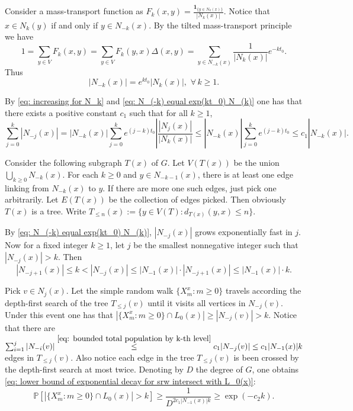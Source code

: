 \documentclass[12pt]{article}
\numberwithin{equation}{section}
\newcommand{\be}{\begin{equation}}
\newcommand{\ee}{\end{equation}}
\newcommand{\1}{\mathbf{1}}
\begin{document}






Consider a mass-transport function as $F_k(x,y)=\frac{\mathbf{1}_{\{y\in N_{k}(x)\} }}{|N_{k}(x)|}$. Notice that $x\in N_{k}(y)$ if and only if $y\in N_{-k}(x)$. By the tilted mass-transport principle we have 
\[
1=\sum_{y\in V}{F_k(x,y)}=\sum_{y\in V}{F_k(y,x)\Delta(x,y)}=\sum_{y\in N_{-k}(x)}{\frac{1}{|N_{k}(x)|}e^{-kt_0}}.
\]
Thus 
\be\label{eq: N_(-k) equal exp(kt_0) N_(k)}
|N_{-k}(x)|=e^{kt_0}|N_{k}(x)|,\,\,\forall\, k\geq 1. 
\ee

By \eqref{eq: increasing for N_k} and \eqref{eq: N_(-k) equal exp(kt_0) N_(k)} one has that there exists a positive constant $c_1$ such that for all $k\geq1$,
\be\label{eq: bounded total population by k-th level}
\sum_{j=0}^{k}|N_{-j}(x)|=|N_{-k}(x)|\sum_{j=0}^{k}e^{(j-k)t_0}|\frac{|N_j(x)|}{|N_k(x)|}
\leq |N_{-k}(x)|\sum_{j=0}^{k}e^{(j-k)t_0}\leq c_1|N_{-k}(x)|.
\ee


Consider the following subgraph $T(x)$ of $G$. Let $V(T(x))$ be the union $\bigcup_{k\geq0}N_{-k}(x)$. For each $k\geq 0$ and $y\in N_{-k-1}(x)$, there is at least one edge linking from $N_{-k}(x)$ to  $y$. If there are more one such edges, just pick one arbitrarily. Let $E(T(x))$ be the collection of edges picked. Then obviously $T(x)$ is a tree. Write $T_{\leq n}(x):=\{ y\in V(T)\colon d_{T(x)}(y,x)\leq n \}$. 

By \eqref{eq: N_(-k) equal exp(kt_0) N_(k)}, $|N_{-j}(x)|$ grows exponentially fast in $j$. Now for a fixed integer $k\geq 1$, let $j$ be the smallest nonnegative integer such that $|N_{-j}(x)|> k$. 
Then \[
|N_{-j+1}(x)|\leq k< |N_{-j}(x)|\leq |N_{-1}(x)|\cdot |N_{-j+1}(x)|\leq |N_{-1}(x)|\cdot k.
\]

Pick $v\in N_j(x)$. Let the simple random walk $\{X_m^x\colon m\geq0 \}$ travels according the depth-first search of the tree $T_{\leq j}(v)$ until it visits all vertices in $N_{-j}(v)$. Under this event one has that $|\{X_m^x\colon m\geq0 \}\cap L_0(x)|\geq |N_{-j}(v)|>k$.  Notice that there are $\sum_{i=1}^{j}|N_{-i}(v)|\stackrel{\eqref{eq: bounded total population by k-th level}}{\leq }c_1|N_{-j}(v)|\leq c_1|N_{-1}(x)|k$ edges in  $T_{\leq j}(v)$. Also notice each edge in the tree $T_{\leq j}(v)$ is been crossed by the depth-first search at most twice.
Denoting by $D$  the degree of $G$, one obtains \eqref{eq: lower bound of exponential decay for srw intersect with L_0(x)}:
\[
\mathbb{P}[|\{X_m^x\colon m\geq0 \}\cap L_0(x)|>k]\geq \frac{1}{D^{2c_1|N_{-1}(x)|k}}\geq \exp(-c_2k).
\]
\end{document}
